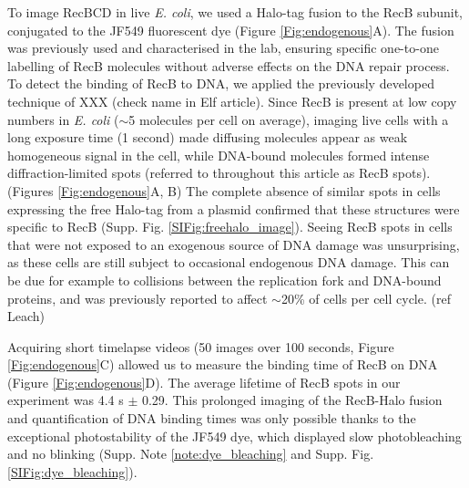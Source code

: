 To image RecBCD in live \textit{E. coli}, we used a Halo-tag fusion to the RecB subunit, conjugated to the JF549 fluorescent dye (Figure \ref{Fig:endogenous}A). The fusion was previously used and characterised in the lab, ensuring specific one-to-one labelling of RecB molecules without adverse effects on the DNA repair process.\cite{Lepore2019} To detect the binding of RecB to DNA, we applied the previously developed technique of XXX (check name in Elf article).\cite{Elf2007}  Since RecB is present at low copy numbers in \textit{E. coli} ($\sim$5 molecules per cell on average\cite{Lepore2019}), imaging live cells with a long exposure time (1 second) made diffusing molecules appear as weak homogeneous signal in the cell, while DNA-bound molecules formed intense diffraction-limited spots (referred to throughout this article as RecB spots). (Figures \ref{Fig:endogenous}A, B) The complete absence of similar spots in cells expressing the free Halo-tag from a plasmid confirmed that these structures were specific to RecB (Supp. Fig. \ref{SIFig:freehalo_image}). Seeing RecB spots in cells that were not exposed to an exogenous source of DNA damage was unsurprising, as these cells are still subject to occasional endogenous DNA damage. This can be due for example to collisions between the replication fork and DNA-bound proteins, and was previously reported to affect $\sim$20\% of cells per cell cycle. (ref Leach)

Acquiring short timelapse videos (50 images over 100 seconds, Figure \ref{Fig:endogenous}C) allowed us to measure the binding time of RecB on DNA (Figure \ref{Fig:endogenous}D). The average lifetime of RecB spots in our experiment was 4.4 s $\pm$ 0.29. This prolonged imaging of the RecB-Halo fusion and quantification of DNA binding times was only possible thanks to the exceptional photostability of the JF549 dye, which displayed slow photobleaching and no blinking (Supp. Note \ref{note:dye_bleaching} and Supp. Fig. \ref{SIFig:dye_bleaching}). 

